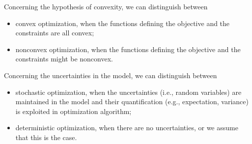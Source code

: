 \documentclass[10pt,a4paper]{article}
\begin{document}
Concerning the hypothesis of convexity, we can distinguish between
\begin{itemize}
	\item convex optimization, when the functions defining the objective and the constraints are all convex;
	\item nonconvex optimization, when the functions defining the objective and the constraints might be nonconvex.
\end{itemize}
Concerning the uncertainties in the model, we can distinguish between
\begin{itemize}
	\item stochastic optimization, when the uncertainties (i.e., random variables) are maintained in the model and their quantification (e.g., expectation, variance) is exploited in optimization algorithm;
	\item deterministic optimization, when there are no uncertainties, or we assume that this is the case.
\end{itemize}
\end{document}
